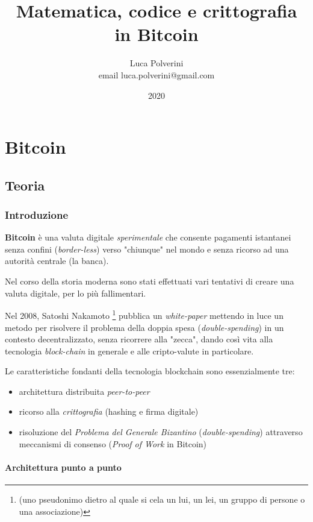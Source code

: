 \documentclass{book}
\title{Matematica, codice e crittografia in Bitcoin}
\author{Luca Polverini \\ email luca.polverini@gmail.com}
\date{2020}
\theoremstyle{definition}
\begin{document}
\maketitle


\newpage

\tableofcontents

\newpage
\part{Bitcoin}

\chapter{Teoria}
\section{Introduzione}

\textbf{Bitcoin} è una valuta digitale \textit{sperimentale} che consente pagamenti istantanei senza confini (\textit{border-less})
verso "chiunque" nel mondo e senza ricorso ad una autorità centrale (la banca).

Nel corso della storia moderna sono stati effettuati vari tentativi di creare una valuta digitale, per lo più fallimentari.

Nel 2008, Satoshi Nakamoto \footnote{(uno pseudonimo dietro al quale si cela un lui, un lei, un gruppo di persone o una associazione)} 
pubblica un \textit{white-paper}\cite{Nakamoto} mettendo in luce un metodo per risolvere il problema della doppia spesa (\textit{double-spending})
in un contesto decentralizzato, senza ricorrere alla "zecca", dando così vita alla tecnologia \textit{block-chain} in generale e alle cripto-valute in particolare.

Le caratteristiche fondanti della tecnologia blockchain sono essenzialmente tre:

\begin{itemize}
    \item architettura distribuita \textit{peer-to-peer}
    \item ricorso alla \textit{crittografia} (hashing e firma digitale)
    \item risoluzione del \textit{Problema del Generale Bizantino} (\textit{double-spending}) attraverso meccanismi di consenso (\textit{Proof of Work} in Bitcoin)
\end{itemize}

\subsection{Architettura punto a punto}
\end{document}
